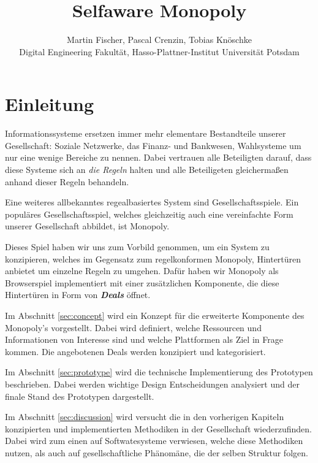 \documentclass[german]{cgspaper} %
\title{Selfaware Monopoly}
\author{Martin Fischer, Pascal Crenzin, Tobias Knöschke\\ Digital Engineering Fakultät, Hasso-Plattner-Institut \textbar{} Universität Potsdam}
\newcommand{\neuerBegriff}[1]{\textbf{\textit{#1}}}
\begin{document}
\teaser{
}

\maketitle

\begin{abstract}
  
\end{abstract}

\copyrightspace %


\section{Einleitung}\label{sec:introduction}

Informationssysteme ersetzen immer mehr elementare Bestandteile unserer Gesellschaft: Soziale Netzwerke, das Finanz- und Bankwesen, Wahlsysteme um nur eine wenige Bereiche zu nennen.
Dabei vertrauen alle Beteiligten darauf, dass diese Systeme sich an \textit{die Regeln} halten und alle Beteiligeten gleichermaßen anhand dieser Regeln behandeln.

Eine weiteres allbekanntes regealbasiertes System sind Gesellschaftsspiele. Ein populäres Gesellschaftsspiel, welches gleichzeitig auch eine vereinfachte Form unserer Gesellschaft abbildet, ist Monopoly.

Dieses Spiel haben wir uns zum Vorbild genommen, um ein System zu konzipieren, welches im Gegensatz zum regelkonformen Monopoly, Hintertüren anbietet um einzelne Regeln zu umgehen. Dafür haben wir Monopoly als Browserspiel implementiert mit einer zusätzlichen Komponente, die diese Hintertüren in Form von \neuerBegriff{Deals} öffnet.


    Im Abschnitt \ref{sec:concept} wird ein Konzept für die erweiterte Komponente des Monopoly's vorgestellt.
    Dabei wird definiert, welche Ressourcen und Informationen von Interesse sind und welche Plattformen als Ziel in Frage kommen.
    Die angebotenen Deals werden konzipiert und kategorisiert.

    Im Abschnitt \ref{sec:prototype} wird die technische Implementierung des Prototypen beschrieben.
    Dabei werden wichtige Design Entscheidungen analysiert und der finale Stand des Prototypen dargestellt.

    Im Abschnitt \ref{sec:discussion} wird versucht die in den vorherigen Kapiteln konzipierten und implementierten Methodiken in der Gesellschaft wiederzufinden.
    Dabei wird zum einen auf Softwatesysteme verwiesen, welche diese Methodiken nutzen, als auch auf gesellschaftliche Phänomäne, die der selben Struktur folgen.
\end{document}
